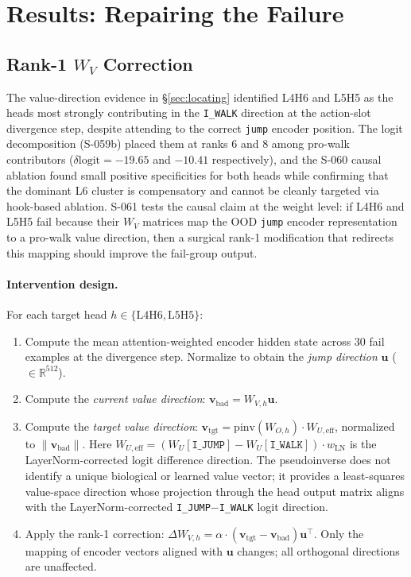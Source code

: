 \section{Results: Repairing the Failure}
\label{sec:repair}

\subsection{\texorpdfstring{Rank-1 $W_V$ Correction}{Rank-1 WV Correction}}

The value-direction evidence in \S\ref{sec:locating} identified L4H6 and L5H5 as the heads
most strongly contributing in the \texttt{I\_WALK} direction at the action-slot divergence
step, despite attending to the correct \texttt{jump} encoder position.
The logit decomposition (S-059b) placed them at ranks 6 and 8 among pro-walk contributors
($\delta\text{logit}=-19.65$ and $-10.41$ respectively), and the S-060 causal ablation
found small positive specificities for both heads while confirming that the dominant L6
cluster is compensatory and cannot be cleanly targeted via hook-based ablation.
S-061 tests the causal claim at the weight level: if L4H6 and L5H5 fail because their
$W_V$ matrices map the OOD \texttt{jump} encoder representation to a pro-walk value
direction, then a surgical rank-1 modification that redirects this mapping should improve
the fail-group output.

\paragraph{Intervention design.}
For each target head $h \in \{\text{L4H6},\text{L5H5}\}$:

\begin{enumerate}
  \item Compute the mean attention-weighted encoder hidden state across 30 fail examples
    at the divergence step. Normalize to obtain the \emph{jump direction}
    $\mathbf{u}$ ($\in\mathbb{R}^{512}$).

  \item Compute the \emph{current value direction}: $\mathbf{v}_\text{bad} = W_{V,h}\mathbf{u}$.

  \item Compute the \emph{target value direction}: $\mathbf{v}_\text{tgt} =
    \mathrm{pinv}(W_{O,h})\cdot W_{U,\text{eff}}$, normalized to $\|\mathbf{v}_\text{bad}\|$.
    Here $W_{U,\text{eff}} = (W_U[\texttt{I\_JUMP}]-W_U[\texttt{I\_WALK}])\cdot w_\text{LN}$
    is the LayerNorm-corrected logit difference direction.
    The pseudoinverse does not identify a unique biological or learned value vector;
    it provides a least-squares value-space direction whose projection through the
    head output matrix aligns with the LayerNorm-corrected \texttt{I\_JUMP}$-$\texttt{I\_WALK}
    logit direction.

  \item Apply the rank-1 correction:
    $\Delta W_{V,h} = \alpha\cdot(\mathbf{v}_\text{tgt}-\mathbf{v}_\text{bad})\mathbf{u}^\top$.
    Only the mapping of encoder vectors aligned with $\mathbf{u}$ changes; all orthogonal
    directions are unaffected.
\end{enumerate}

